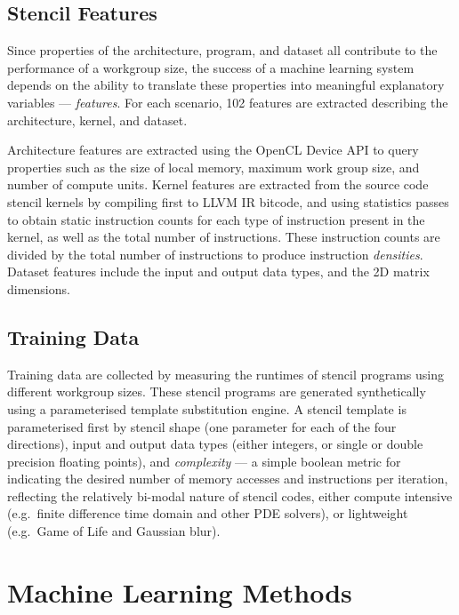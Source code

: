 \documentclass[preprint,nonatbib,10pt]{sigplanconf}
\begin{document}
\subsection{Stencil Features}

Since properties of the architecture, program, and dataset all
contribute to the performance of a workgroup size, the success of a
machine learning system depends on the ability to translate these
properties into meaningful explanatory variables ---
\emph{features}. For each scenario, 102 features are extracted
describing the architecture, kernel, and dataset.

Architecture features are extracted using the OpenCL Device API to
query properties such as the size of local memory, maximum work group
size, and number of compute units. Kernel features are extracted from
the source code stencil kernels by compiling first to LLVM IR bitcode,
and using statistics passes to obtain static instruction counts for
each type of instruction present in the kernel, as well as the total
number of instructions. These instruction counts are divided by the
total number of instructions to produce instruction
\emph{densities}. Dataset features include the input and output data
types, and the 2D matrix dimensions.


\subsection{Training Data}\label{subsec:training}

Training data are collected by measuring the runtimes of stencil
programs using different workgroup sizes. These stencil programs are
generated synthetically using a parameterised template substitution
engine. A stencil template is parameterised first by stencil shape
(one parameter for each of the four directions), input and output data
types (either integers, or single or double precision floating
points), and \emph{complexity} --- a simple boolean metric for
indicating the desired number of memory accesses and instructions per
iteration, reflecting the relatively bi-modal nature of stencil codes,
either compute intensive (e.g.\ finite difference time domain and
other PDE solvers), or lightweight (e.g.\ Game of Life and Gaussian
blur).


\section{Machine Learning Methods}\label{sec:ml}
\end{document}
